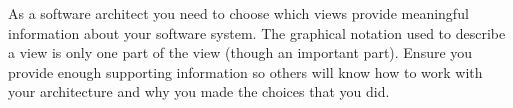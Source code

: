 As a software architect you need to choose which views provide meaningful information about your software system.
The graphical notation used to describe a view is only one part of the view (though an important part).
Ensure you provide enough supporting information so others will know how to work with your architecture and why you made the choices that you did.